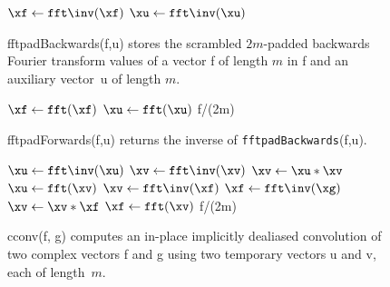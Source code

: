 \documentclass[final]{siamltex}
\begin{document}
\begin{figure}[htbp]
\begin{minipage}{0.5\linewidth}
\begin{procedure}[H]
  $\xf \leftarrow \fft\inv(\xf)$\;
  $\xu \leftarrow \fft\inv(\xu)$\;
  \caption{fftpadBackwards({\sf f},{\sf u}) stores the scrambled
$2m$-padded backwards Fourier transform values of a vector
{\sf f} of length $m$ in {\sf f} and an auxiliary vector~{\sf u} of length $m$.}\label{fftpadBackwards}
\end{procedure}
\def\fftpadBackwards{{\tt fftpadBackwards}}
\begin{function}[H]
  $\xf \leftarrow \fft(\xf)$\;
  $\xu \leftarrow \fft(\xu)$\;
  \Return f/(2m)\;
  \caption{fftpadForwards({\sf f},{\sf u}) returns the
inverse of \fftpadBackwards({\sf f},{\sf u}).}\label{fftpadForwards} 
\end{function}
%
\end{minipage}
\begin{minipage}{0.49\linewidth}
\begin{function}[H]
  \medskip
  $\xu \leftarrow \fft\inv(\xu)$\;
  $\xv \leftarrow \fft\inv(\xv)$\;
  $\xv \leftarrow \xu * \xv$\;
  $\xu \leftarrow \fft(\xv)$\;
  \medskip
  $\xv \leftarrow \fft\inv(\xf)$\;
  $\xf \leftarrow \fft\inv(\xg)$\;
  $\xv \leftarrow \xv * \xf$\;
  $\xf \leftarrow \fft(\xv)$\;
  \medskip
  \Return f/(2m)\;
\caption{cconv({\sf f}, {\sf g}) computes
an in-place implicitly dealiased convolution of two complex vectors {\sf f}
and {\sf g} using two temporary vectors {\sf u} and {\sf v}, each of
length~$m$.}\label{cconv}
\end{function}
\end{minipage}
\end{figure}
\end{document}
